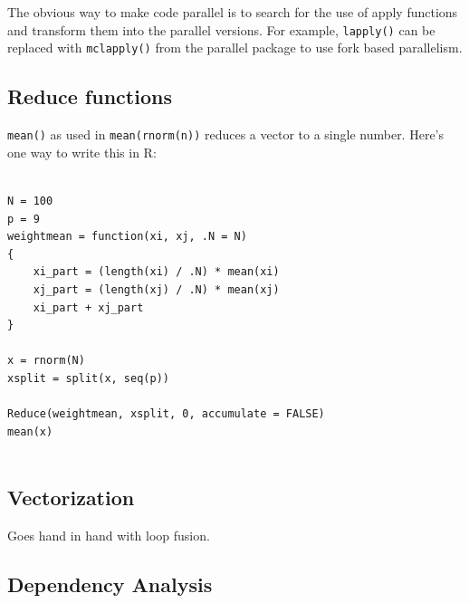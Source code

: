 \documentclass[12pt]{article}
\begin{document}
The obvious way to make code parallel is to search for the use of
apply functions and transform them into the parallel versions. For example, 
\texttt{lapply()} can be replaced with \texttt{mclapply()} from the
parallel package to use fork based parallelism.

\subsection{Reduce functions}

\texttt{mean()} as used in \texttt{mean(rnorm(n))} reduces a vector to a
single number. Here's one way to write this in R:


\begin{verbatim}

N = 100
p = 9
weightmean = function(xi, xj, .N = N)
{
    xi_part = (length(xi) / .N) * mean(xi)
    xj_part = (length(xj) / .N) * mean(xj)
    xi_part + xj_part
}

x = rnorm(N)
xsplit = split(x, seq(p))

Reduce(weightmean, xsplit, 0, accumulate = FALSE)
mean(x)


\end{verbatim}


\subsection{Vectorization}

Goes hand in hand with loop fusion.

\subsection{Dependency Analysis}



 
\end{document}
